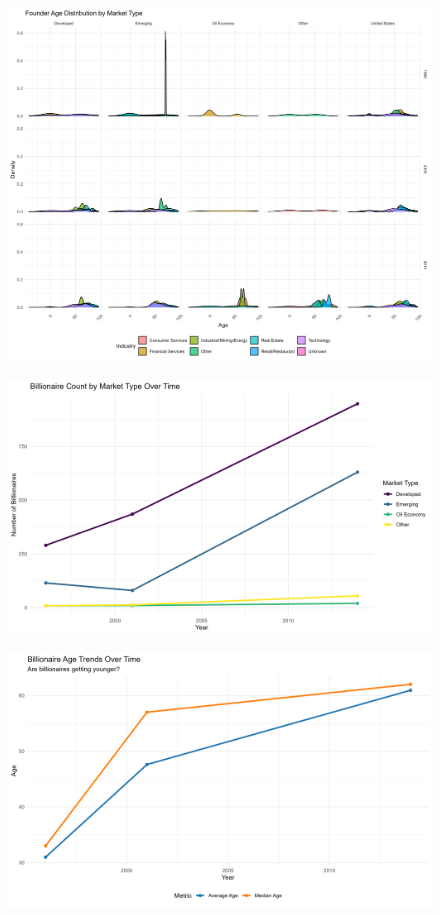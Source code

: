\documentclass[
  man,floatsintext]{apa6}
\begin{document}
\begin{figure}
\includegraphics[width=0.9\linewidth]{../Question4/Results/founder_age_by_market_type} \caption{ }\label{fig:founder-age-image}
\end{figure}

\begin{figure}
\includegraphics[width=0.9\linewidth]{../Question4/Results/billmarket} \caption{ }\label{fig:billmarket-image}
\end{figure}

\begin{figure}
\includegraphics[width=0.9\linewidth]{../Question4/Results/ageave} \caption{ }\label{fig:ageave-image}
\end{figure}
\end{document}
